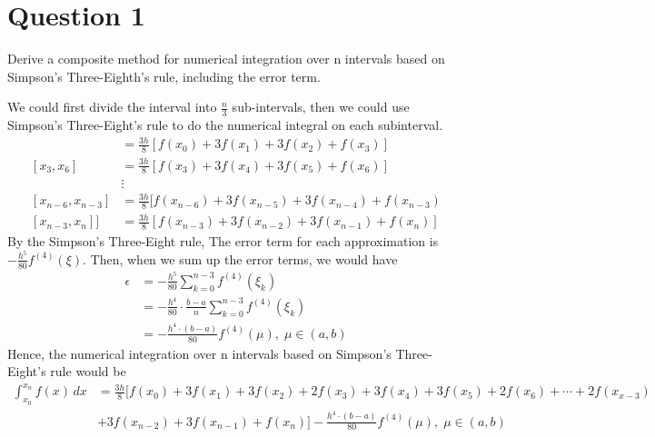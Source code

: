 \section{Question 1}

\begin{question}
    Derive a composite method for numerical integration over n intervals based on Simpson’s Three-Eighth’s rule, including the error term.
\end{question}

\begin{answer}
    We could first divide the interval into $\tfrac{n}{3}$ sub-intervals, then we could use Simpson's Three-Eight's rule to do the numerical integral on each subinterval.
    \begin{align}
        [x_0,x_3] &= \tfrac{3h}{8}[f(x_0) + 3f(x_1) + 3f(x_2) + f(x_3)]\\
        [x_3,x_6] &= \tfrac{3h}{8}[f(x_3) + 3f(x_4) + 3f(x_5) + f(x_6)]\\
        & \vdots \\
        [x_{n-6},x_{n-3}] &= \tfrac{3h}{8}[f(x_{n-6}) + 3f(x_{n-5}) + 3f(x_{n-4}) + f(x_{n-3})\\
        [x_{n-3},x_{n}]] &= \tfrac{3h}{8}[f(x_{n-3}) + 3f(x_{n-2}) + 3f(x_{n-1}) + f(x_n)]
    \end{align}
    By the Simpson's Three-Eight rule, The error term for each approximation is $-\tfrac{h^5}{80}f^{(4)}(\xi)$. Then, when we sum up the error terms, we would have
    \begin{align}
        \epsilon &= -\tfrac{h^5}{80}\sum_{k = 0}^{n-3}f^{(4)}(\xi_k)\\
        &= -\tfrac{h^4}{80}\cdot\tfrac{b-a}{n}\sum_{k = 0}^{n-3}f^{(4)}(\xi_k)\\
        &= -\tfrac{h^4\cdot(b-a)}{80}f^{(4)}(\mu), \; \mu \in (a,b)
    \end{align}
    Hence, the numerical integration over n intervals based on Simpson's Three-Eight's rule would be
    \begin{equation}
        \begin{aligned}
            \int_{x_0}^{x_n}f(x) \,dx &= \tfrac{3h}{8}[f(x_0) + 3f(x_1) + 3f(x_2) + 2f(x_3) + 3f(x_4) + 3f(x_5) + 2f(x_6) + \cdots + 2f(x_{x-3})\\
            &+ 3f(x_{n-2}) + 3f(x_{n-1}) + f(x_n)] - \tfrac{h^4\cdot(b-a)}{80}f^{(4)}(\mu), \; \mu \in (a,b)\\
        \end{aligned}
    \end{equation}
\end{answer}